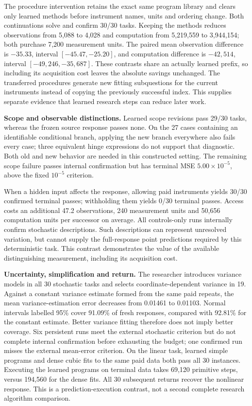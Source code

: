 \documentclass[11pt,a4paper]{article}
\begin{document}
The procedure intervention retains the exact same program library and clears
only learned methods before instrument names, units and ordering change. Both
continuations solve and confirm 30/30 tasks. Keeping the methods reduces
observations from 5,088 to 4,028 and computation from 5,219,559 to 3,944,154;
both purchase 7,200 measurement units. The paired mean observation difference is
\(-35.33\), interval \([-45.47,-25.20]\), and computation difference is \(-42{,}514\),
interval \([-49{,}246,-35{,}687]\). These contrasts share an actually learned prefix,
so including its acquisition cost leaves the absolute savings unchanged. The
transferred procedures generate new fitting subquestions for the current
instruments instead of copying the previously successful index. This supplies
separate evidence that learned research steps can reduce later work.


\textbf{Scope and observable distinctions.} Learned scope revisions pass 29/30 tasks,
whereas the frozen source response passes none. On the 27 cases containing an
identifiable conditional branch, applying the new branch everywhere also fails
every case; three equivalent hinge expressions do not support that diagnostic.
Both old and new behavior are needed in this constructed setting. The remaining
scope failure passes internal confirmation but has terminal MSE
\(5.00\times10^{-5}\), above the fixed \(10^{-5}\) criterion.


When a hidden input affects the response, allowing paid instruments yields
30/30 confirmed terminal passes; withholding them yields 0/30 terminal passes.
Access costs an additional 47.2 observations, 240 measurement units and 50,656
computation units per successor on average. All controls-only runs internally
confirm stochastic descriptions. Such descriptions can represent unresolved
variation, but cannot supply the full-response point predictions required by
this deterministic task. This contrast demonstrates the value of the available
distinguishing measurement, including its acquisition cost.


\textbf{Uncertainty, simplification and return.} The researcher introduces variance
models in all 30 stochastic tasks and selects coordinate-dependent variance in
19. Against a constant variance estimate formed from the same paid repeats, the
mean variance-estimation error decreases from 0.01461 to 0.01103. Normal intervals
labelled 95\% cover 91.09\% of fresh responses, compared with 92.81\% for the constant
estimate. Better variance fitting therefore does not imply better coverage. Six
persistent runs meet the external stochastic criterion but do not complete
internal confirmation before exhausting the budget; one confirmed run misses
the external mean-error criterion. On the linear task, learned simple programs
and dense cubic fits to the same paid data both pass all 30 instances. Executing
the learned programs on terminal data takes 69,120 primitive steps, versus
194,560 for the dense fits. All 30 subsequent returns recover the nonlinear
response. This is a prediction-execution contrast, not a second complete research
algorithm comparison.
\end{document}
